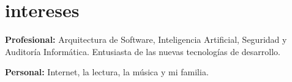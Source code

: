 \documentclass[]{friggeri-cv} %
\begin{document}





\section{intereses}

\textbf{Profesional:} Arquitectura de Software, Inteligencia Artificial, Seguridad y Auditoría Informática. Entusiasta de las nuevas tecnologías de desarrollo. 

\textbf{Personal:} Internet, la lectura, la música y mi familia.

\end{document}
